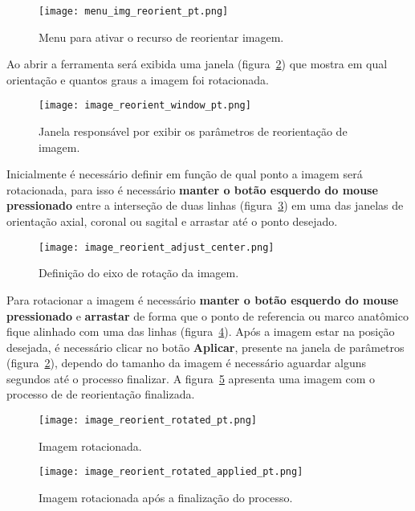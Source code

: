\begin{figure}[!htb]
\centering
\texttt{[image: menu\_img\_reorient\_pt.png]}
\caption{Menu para ativar o recurso de reorientar imagem.}
\label{fig:menu_img_reorient}
\end{figure}

Ao abrir a ferramenta será exibida uma janela (figura~\ref{fig:image_reorient_window}) que mostra em qual orientação e quantos graus a imagem foi rotacionada.

\begin{figure}[!htb]
\centering
\texttt{[image: image\_reorient\_window\_pt.png]}
\caption{Janela responsável por exibir os parâmetros de reorientação de imagem.}
\label{fig:image_reorient_window}
\end{figure}

Inicialmente é necessário definir em função de qual ponto a imagem será rotacionada, para isso é necessário \textbf{manter o botão esquerdo do mouse pressionado} entre a interseção de duas linhas (figura~\ref{fig:image_reorient_adjust_center}) em uma das janelas de orientação axial, coronal ou sagital e arrastar até o ponto desejado.

\begin{figure}[!htb]
\centering
\texttt{[image: image\_reorient\_adjust\_center.png]}
\caption{Definição do eixo de rotação da imagem.}
\label{fig:image_reorient_adjust_center}
\end{figure}

Para rotacionar a imagem é necessário \textbf{manter o botão esquerdo do mouse pressionado} e \textbf{arrastar} de forma que o ponto de referencia ou marco anatômico fique alinhado com uma das linhas (figura~\ref{fig:image_reorient_rotated}). Após a imagem estar na posição desejada, é necessário clicar no botão \textbf{Aplicar}, presente na janela de parâmetros (figura~\ref{fig:image_reorient_window}), dependo do tamanho da imagem é necessário aguardar alguns segundos até o processo finalizar. A figura~\ref{fig:image_reorient_rotated_applied} apresenta uma imagem com o processo de de reorientação finalizada.

\begin{figure}[!htb]
\centering
\texttt{[image: image\_reorient\_rotated\_pt.png]}
\caption{Imagem rotacionada.}
\label{fig:image_reorient_rotated}
\end{figure}

\begin{figure}[!htb]
\centering
\texttt{[image: image\_reorient\_rotated\_applied\_pt.png]}
\caption{Imagem rotacionada após a finalização do processo.}
\label{fig:image_reorient_rotated_applied}
\end{figure}